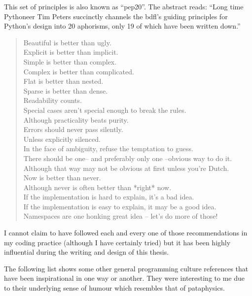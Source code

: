 This set of principles is also known as ``\acrshort{pep}20''. The abstract reads: ``Long time Pythoneer Tim Peters succinctly channels the \acrshort{bdfl}'s guiding principles for Python's design into 20 aphorisms, only 19 of which have been written down.'' \citeyear{PEP20}

\begin{quotation}
  Beautiful is better than ugly.\\
  Explicit is better than implicit.\\
  Simple is better than complex.\\
  Complex is better than complicated.\\
  Flat is better than nested.\\
  Sparse is better than dense.\\
  Readability counts.\\
  Special cases aren't special enough to break the rules.\\
  Although practicality beats purity.\\
  Errors should never pass silently.\\
  Unless explicitly silenced.\\
  In the face of ambiguity, refuse the temptation to guess.\\
  There should be one-- and preferably only one --obvious way to do it.\\
  Although that way may not be obvious at first unless you're Dutch.\\
  Now is better than never.\\
  Although never is often better than *right* now.\\
  If the implementation is hard to explain, it's a bad idea.\\
  If the implementation is easy to explain, it may be a good idea.\\
  Namespaces are one honking great idea -- let's do more of those!
\end{quotation}

I cannot claim to have followed each and every one of those recommendations in my coding practice (although I have certainly tried) but it has been highly influential during the writing and design of this thesis.

\spirals

The following list shows some other general programming culture references that have been inspirational in one way or another. They were interesting to me due to their underlying sense of humour which resembles that of pataphysics.

